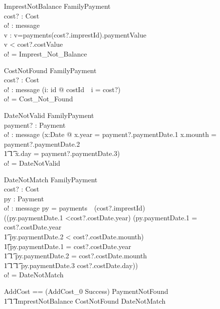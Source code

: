 \documentclass{article}
\begin{document}
\begin{schema}{ImprestNotBalance}
\Xi FamilyPayment\\
cost? : Cost\\
o! : message\\
v : \nat
\where
v=payments(cost?.imprestId).paymentValue\\
v < cost?.costValue\\
o! = Imprest_Not_Balance
\end{schema}

\begin{schema}{CostNotFound}
\Xi FamilyPayment\\
cost? : Cost\\
o! : message
\where
\lnot(\exists i: id @ costId~~i = cost?)\\
o! = Cost_Not_Found
\end{schema}

\begin{schema}{DateNotValid}
\Xi FamilyPayment\\
payment? : Payment\\
o! : message
\where
\lnot (\exists x:Date @ x.year = payment?.paymentDate.1 \land x.mounth = payment?.paymentDate.2 \land\\
\t1 \t1 x.day = payment?.paymentDate.3)\\
o! = DateNotValid
\end{schema}

\begin{schema}{DateNotMatch}
\Xi FamilyPayment\\
cost? : Cost\\
py : Payment\\
o! : message
\where
py = payments~~(cost?.imprestId)\\
\lnot((py.paymentDate.1 <cost?.costDate.year) \lor (py.paymentDate.1  = cost?.costDate.year \land \\
\t1 py.paymentDate.2 < cost?.costDate.mounth) \lor\\
\t1(py.paymentDate.1  = cost?.costDate.year \land\\
\t1 \t1 py.paymentDate.2 = cost?.costDate.mounth\land\\
\t1 \t1 \t1 py.paymentDate.3 \le cost?.costDate.day))\\
o! = DateNotMatch
\end{schema}

\begin{zed}
AddCost == (AddCost_0 \land Success) \lor PaymentNotFound \lor \\
\t1 \t1 ImprestNotBalance \lor CostNotFound \lor DateNotMatch
\end{zed}
\end{document}
